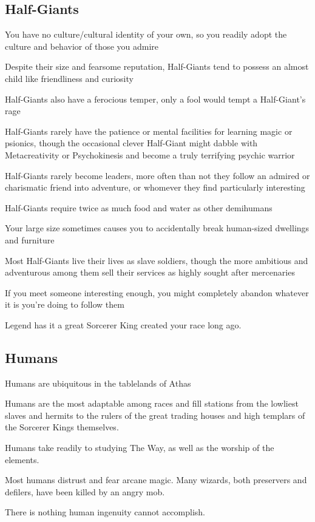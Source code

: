 \subsection{Half-Giants}

\begin{description}
    \item You have no culture/cultural identity of your own, so you readily adopt the culture and behavior of those you admire
    \item Despite their size and fearsome reputation, Half-Giants tend to possess an almost child like friendliness and curiosity
    \item Half-Giants also have a ferocious temper, only a fool would tempt a Half-Giant’s rage
    \item Half-Giants rarely have the patience or mental facilities for learning magic or psionics, though the occasional clever Half-Giant might dabble with Metacreativity or Psychokinesis and become a truly terrifying psychic warrior
    \item Half-Giants rarely become leaders, more often than not they follow an admired or charismatic friend into adventure, or whomever they find particularly interesting
    \item Half-Giants require twice as much food and water as other demihumans
    \item Your large size sometimes causes you to accidentally break human-sized dwellings and furniture
    \item Most Half-Giants live their lives as slave soldiers, though the more ambitious and adventurous among them sell their services as highly sought after mercenaries
    \item If you meet someone interesting enough, you might completely abandon whatever it is you’re doing to follow them
    \item Legend has it a great Sorcerer King created your race long ago.
\end{description}

\subsection{Humans}

\begin{description}
    \item Humans are ubiquitous in the tablelands of Athas
    \item Humans are the most adaptable among races and fill stations from the lowliest slaves and hermits to the rulers of the great trading houses and high templars of the Sorcerer Kings themselves.
    \item Humans take readily to studying The Way, as well as the worship of the elements.
    \item Most humans distrust and fear arcane magic. Many wizards, both preservers and defilers, have been killed by an angry mob.
    \item There is nothing human ingenuity cannot accomplish.
\end{description}

